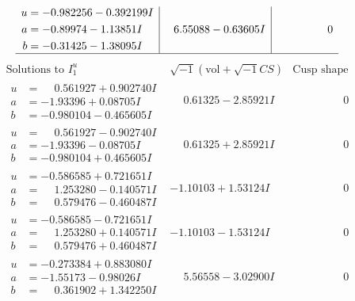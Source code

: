 \documentclass[1p]{elsarticle_modified}
\theoremstyle{definition}
\newcommand{\I}{\sqrt{-1}}
\begin{document}
$$\begin{array}{c|c|c}
\begin{aligned}
u &= -0.982256 - 0.392199 I \\
a &= -0.89974 - 1.13851 I \\
b &= -0.31425 - 1.38095 I\end{aligned}
 & \phantom{-}6.55088 - 0.63605 I & \phantom{-0.000000 } 0\\
 \hline 
 \end{array}$$\newpage$$\begin{array}{c|c|c}  
\text{Solutions to }I^u_{1}& \I (\text{vol} + \sqrt{-1}CS) & \text{Cusp shape}\\
 \hline 
\begin{aligned}
u &= \phantom{-}0.561927 + 0.902740 I \\
a &= -1.93396 + 0.08705 I \\
b &= -0.980104 - 0.465605 I\end{aligned}
 & \phantom{-}0.61325 - 2.85921 I & \phantom{-0.000000 } 0 \\ \hline\begin{aligned}
u &= \phantom{-}0.561927 - 0.902740 I \\
a &= -1.93396 - 0.08705 I \\
b &= -0.980104 + 0.465605 I\end{aligned}
 & \phantom{-}0.61325 + 2.85921 I & \phantom{-0.000000 } 0 \\ \hline\begin{aligned}
u &= -0.586585 + 0.721651 I \\
a &= \phantom{-}1.253280 - 0.140571 I \\
b &= \phantom{-}0.579476 - 0.460487 I\end{aligned}
 & -1.10103 + 1.53124 I & \phantom{-0.000000 } 0 \\ \hline\begin{aligned}
u &= -0.586585 - 0.721651 I \\
a &= \phantom{-}1.253280 + 0.140571 I \\
b &= \phantom{-}0.579476 + 0.460487 I\end{aligned}
 & -1.10103 - 1.53124 I & \phantom{-0.000000 } 0 \\ \hline\begin{aligned}
u &= -0.273384 + 0.883080 I \\
a &= -1.55173 - 0.98026 I \\
b &= \phantom{-}0.361902 + 1.342250 I\end{aligned}
 & \phantom{-}5.56558 - 3.02900 I & \phantom{-0.000000 } 0 \\ \hline\begin{aligned}

\end{aligned}
\end{array}$$
\end{document}
